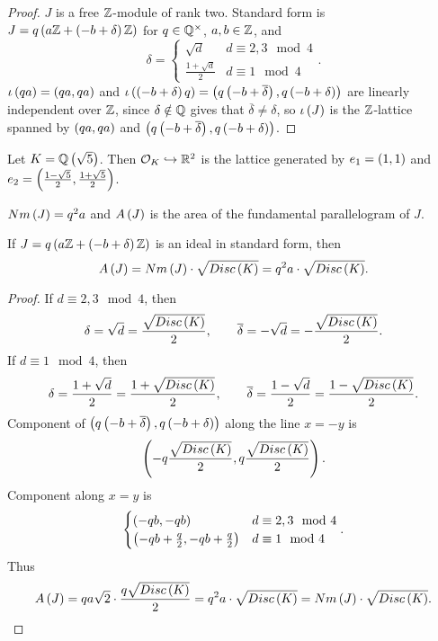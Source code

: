 \begin{proof}
$ J $ is a free $ \mathbb{Z} $-module of rank two. Standard form is $ J = q\left( a\mathbb{Z} + \left( -b + \delta \right)\mathbb{Z} \right) $ for $ q \in \mathbb{Q}^\times $, $ a, b \in \mathbb{Z} $, and
$$ \delta =
\begin{cases}
\sqrt{d} & d \equiv 2, 3 \mod 4 \\
\tfrac{1 + \sqrt{d}}{2} & d \equiv 1 \mod 4
\end{cases}.
$$
$ \iota\left( qa \right) = \left( qa, qa \right) $ and $ \iota\left( \left( -b + \delta \right)q \right) = \left( q\left( -b + \overline{\delta} \right), q\left( -b + \delta \right) \right) $ are linearly independent over $ \mathbb{Z} $, since $ \delta \notin \mathbb{Q} $ gives that $ \overline{\delta} \ne \delta $, so $ \iota\left( J \right) $ is the $ \mathbb{Z} $-lattice spanned by $ \left( qa, qa \right) $ and $ \left( q\left( -b + \overline{\delta} \right), q\left( -b + \delta \right) \right) $.
\end{proof}

\begin{example*}
Let $ K = \mathbb{Q}\left( \sqrt{5} \right) $. Then $ \mathcal{O}_K \hookrightarrow \mathbb{R}^2 $ is the lattice generated by $ e_1 = \left( 1, 1 \right) $ and $ e_2 = \left( \tfrac{1 - \sqrt{5}}{2}, \tfrac{1 + \sqrt{5}}{2} \right) $.
\end{example*}

\pagebreak

$ Nm\left( J \right) = q^2a $ and $ A\left( J \right) $ is the area of the fundamental parallelogram of $ J $.

\begin{proposition}
If $ J = q\left( a\mathbb{Z} + \left( -b + \delta \right)\mathbb{Z} \right) $ is an ideal in standard form, then
$$ A\left( J \right) = Nm\left( J \right) \cdot \sqrt{Disc\left( K \right)} = q^2a \cdot \sqrt{Disc\left( K \right)}. $$
\end{proposition}

\begin{proof}
If $ d \equiv 2, 3 \mod 4 $, then
$$ \delta = \sqrt{d} = \dfrac{\sqrt{Disc\left( K \right)}}{2}, \qquad \overline{\delta} = -\sqrt{d} = -\dfrac{\sqrt{Disc\left( K \right)}}{2}. $$
If $ d \equiv 1 \mod 4 $, then
$$ \delta = \dfrac{1 + \sqrt{d}}{2} = \dfrac{1 + \sqrt{Disc\left( K \right)}}{2}, \qquad \overline{\delta} = \dfrac{1 - \sqrt{d}}{2} = \dfrac{1 - \sqrt{Disc\left( K \right)}}{2}. $$
Component of $ \left( q\left( -b + \overline{\delta} \right), q\left( -b + \delta \right) \right) $ along the line $ x = -y $ is
$$ \left( -q\dfrac{\sqrt{Disc\left( K \right)}}{2}, q\dfrac{\sqrt{Disc\left( K \right)}}{2} \right). $$
Component along $ x = y $ is
$$
\begin{cases}
\left( -qb, -qb \right) & d \equiv 2, 3 \mod 4 \\
\left( -qb + \tfrac{q}{2}, -qb + \tfrac{q}{2} \right) & d \equiv 1 \mod 4
\end{cases}.
$$
Thus
$$ A\left( J \right) = qa\sqrt{2} \cdot \dfrac{q\sqrt{Disc\left( K \right)}}{2} = q^2a \cdot \sqrt{Disc\left( K \right)} = Nm\left( J \right) \cdot \sqrt{Disc\left( K \right)}. $$
\end{proof}


